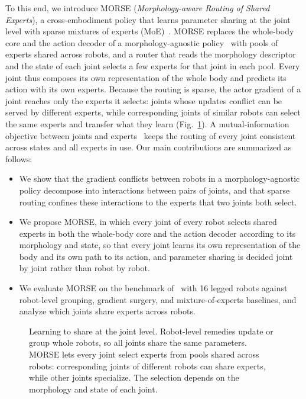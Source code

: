 To this end, we introduce MORSE (\emph{Morphology-aware Routing of Shared Experts}), a cross-embodiment policy that
learns parameter sharing at the joint level with sparse mixtures of experts
(MoE)~\citep{shazeer2017outrageously,fedus2022switch}. MORSE replaces the whole-body core and the action decoder of a
morphology-agnostic policy~\citep{bohlinger2024onepolicy} with pools of experts shared across robots, and a router that
reads the morphology descriptor and the state of each joint selects a few experts for that joint in each pool. Every
joint thus composes its own representation of the whole body and predicts its action with its own experts. Because the
routing is sparse, the actor gradient of a joint reaches only the experts it selects: joints whose updates conflict can
be served by different experts, while corresponding joints of similar robots can select the same experts and transfer
what they learn (Fig.~\ref{fig:teaser}). A mutual-information objective between joints and
experts~\citep{chen2023modsquad} keeps the routing of every joint consistent across states and all experts in use.
Our main contributions are summarized as follows:
\begin{itemize}
\item We show that the gradient conflicts between
robots in a morphology-agnostic policy decompose into interactions between pairs of joints, and that sparse routing
confines these interactions to the experts that two joints both select.
\item We propose MORSE, in which every joint of every robot
selects shared experts in both the whole-body core and the action decoder according to its morphology and state, so
that every joint learns its own representation of the body and its own path to its action, and parameter sharing is
decided joint by joint rather than robot by robot.
\item We evaluate MORSE on the benchmark
of~\citet{abe2026crossembodimentoffline} with 16 legged robots against robot-level grouping, gradient surgery, and
mixture-of-experts baselines, and analyze which joints share experts across robots.
\end{itemize}

\begin{figure}[t]
\centering
\fbox{\rule{0pt}{1.4in}\rule{0.95\linewidth}{0pt}}
\caption{Learning to share at the joint level. Robot-level remedies update or group whole robots, so all joints share
the same parameters. MORSE lets every joint select experts from pools shared across robots: corresponding joints of
different robots can share experts, while other joints specialize. The selection depends on the morphology and state
of each joint.}
\label{fig:teaser}
\end{figure}

